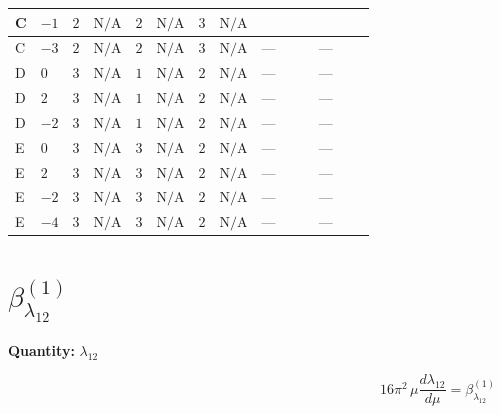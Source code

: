 \documentclass[8pt]{article}
\begin{document}
\begin{landscape}
\begin{longtable}{@{}llcccccc >{\raggedright\arraybackslash}p{0.21\linewidth} >{\raggedright\arraybackslash}p{0.21\linewidth}@{}}
\midrule
C & $-1$ & $2$ & $\text{N/A}$ & $2$ & $\text{N/A}$ & $3$ & $\text{N/A}$ & \scriptsize\adjustbox{max width=\linewidth}{$\begin{gathered} +2 {\lambda_{7}} {\lambda_{S_1}^{(1)}}\end{gathered}$} & \scriptsize\adjustbox{max width=\linewidth}{$\begin{gathered} +4 {\lambda_{8}} {\lambda_{9}}\end{gathered}$} \\
\midrule
C & $-3$ & $2$ & $\text{N/A}$ & $2$ & $\text{N/A}$ & $3$ & $\text{N/A}$ & --- & --- \\
\midrule
D & $0$ & $3$ & $\text{N/A}$ & $1$ & $\text{N/A}$ & $2$ & $\text{N/A}$ & --- & --- \\
\midrule
D & $2$ & $3$ & $\text{N/A}$ & $1$ & $\text{N/A}$ & $2$ & $\text{N/A}$ & --- & --- \\
\midrule
D & $-2$ & $3$ & $\text{N/A}$ & $1$ & $\text{N/A}$ & $2$ & $\text{N/A}$ & --- & --- \\
\midrule
E & $0$ & $3$ & $\text{N/A}$ & $3$ & $\text{N/A}$ & $2$ & $\text{N/A}$ & --- & --- \\
\midrule
E & $2$ & $3$ & $\text{N/A}$ & $3$ & $\text{N/A}$ & $2$ & $\text{N/A}$ & --- & --- \\
\midrule
E & $-2$ & $3$ & $\text{N/A}$ & $3$ & $\text{N/A}$ & $2$ & $\text{N/A}$ & --- & --- \\
\midrule
E & $-4$ & $3$ & $\text{N/A}$ & $3$ & $\text{N/A}$ & $2$ & $\text{N/A}$ & --- & --- \\
\midrule
\bottomrule
\end{longtable}
\clearpage
\section*{$\beta_{\lambda_{12}}^{(1)}$}
\noindent\textbf{Quantity: }$\lambda_{12}$\par\smallskip
\[16\pi^2\,\mu\frac{d \lambda_{12}}{d\mu}=\beta_{\lambda_{12}}^{(1)}\]

\end{landscape}
\end{document}
